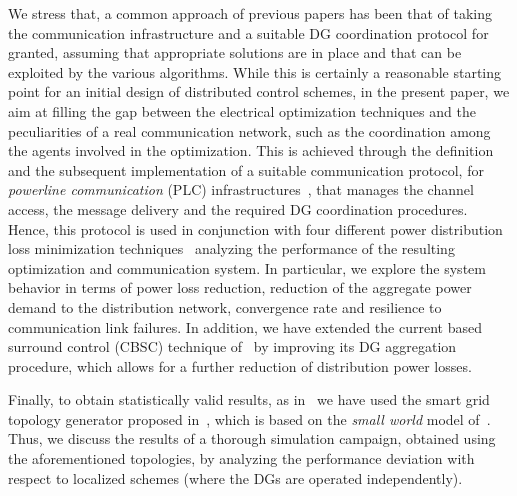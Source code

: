 \documentclass[journal]{IEEEtran}
\begin{document}
We stress that, a common approach of previous papers has been that of taking the communication infrastructure and a suitable DG coordination protocol for granted, assuming that appropriate solutions are in place and that can be exploited by the various algorithms. While this is certainly a reasonable starting point for an initial design of distributed control schemes, in the present paper, we aim at filling the gap between the electrical optimization techniques and the peculiarities of a real communication network, such as the coordination among the agents involved in the optimization. 
This is achieved through the definition and the subsequent implementation of a suitable communication protocol, for {\it powerline communication} (PLC) infrastructures~\cite{Galli, PLC-STANDARD}, that manages the channel access, the message delivery and the required DG coordination procedures. Hence, this protocol is used in conjunction with four different power distribution loss minimization techniques~\cite{LC,SurroundControl,DORPF} analyzing the performance of the resulting optimization and communication system. In particular, we explore the system behavior in terms of power loss reduction, reduction of the aggregate power demand to the distribution network, convergence rate and resilience to communication link failures. In addition, we have extended the current based surround control (CBSC) technique of~\cite{SurroundControl} by improving its DG aggregation procedure, which allows for a further reduction of distribution power losses. 

Finally, to obtain statistically valid results, as in~\cite{TOM-PAG-AI} we have used the smart grid topology generator proposed in~\cite{PAG-AI}, which is based on the {\it small world} model of~\cite{SmallWorld}. Thus, we discuss the results of a thorough simulation campaign, obtained using the aforementioned topologies, by analyzing the performance deviation with respect to localized schemes (where the DGs are operated independently). 
\end{document}
